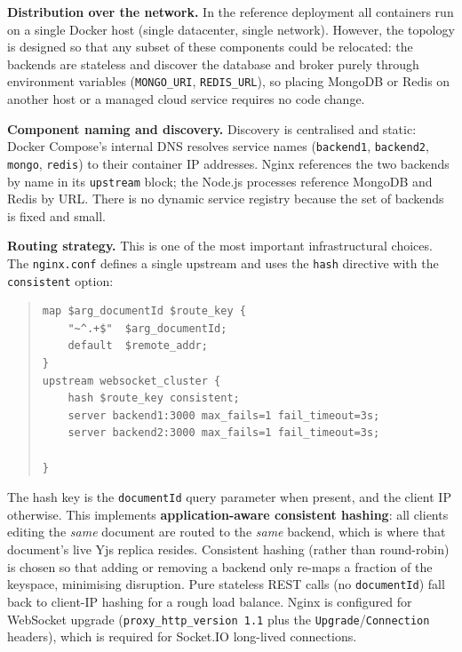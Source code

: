 \documentclass{scrartcl}
\begin{document}
  \textbf{Distribution over the network.} In the reference deployment all containers run on a single Docker host (single datacenter, single network). However, the topology is designed so that any subset of these components could be relocated: the backends are stateless and discover the database and broker purely through environment variables (\texttt{MONGO\_URI}, \texttt{REDIS\_URL}), so placing MongoDB or Redis on another host or a managed cloud service requires no code change.

  \textbf{Component naming and discovery.} Discovery is centralised and static: Docker Compose's internal DNS resolves service names (\texttt{backend1}, \texttt{backend2}, \texttt{mongo}, \texttt{redis}) to their container IP addresses. Nginx references the two backends by name in its \texttt{upstream} block; the Node.js processes reference MongoDB and Redis by URL. There is no dynamic service registry because the set of backends is fixed and small.

  \textbf{Routing strategy.} This is one of the most important infrastructural choices. The \texttt{nginx.conf} defines a single upstream and uses the \texttt{hash} directive with the \texttt{consistent} option:

  \begin{quote}
    \begin{verbatim}
map $arg_documentId $route_key {
    "~^.+$"  $arg_documentId;
    default  $remote_addr;
}
upstream websocket_cluster {
    hash $route_key consistent;
    server backend1:3000 max_fails=1 fail_timeout=3s;
    server backend2:3000 max_fails=1 fail_timeout=3s;

}
    \end{verbatim}
  \end{quote}

  The hash key is the \texttt{documentId} query parameter when present, and the client IP otherwise. This implements \textbf{application-aware consistent hashing}: all clients editing the \emph{same} document are routed to the \emph{same} backend, which is where that document's live Yjs replica resides. Consistent hashing (rather than round-robin) is chosen so that adding or removing a backend only re-maps a fraction of the keyspace, minimising disruption. Pure stateless REST calls (no \texttt{documentId}) fall back to client-IP hashing for a rough load balance. Nginx is configured for WebSocket upgrade (\texttt{proxy\_http\_version 1.1} plus the \texttt{Upgrade}/\texttt{Connection} headers), which is required for Socket.IO long-lived connections.
\end{document}
